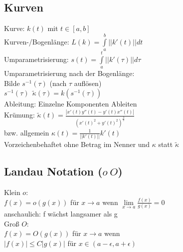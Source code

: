 \documentclass[6pt,a4paper]{scrartcl}
\newcommand{\enbrace}[1]{\ensuremath{\left(#1\right)}}
\begin{document}
\begin{multicols}{4}
\subsection{Kurven}
Kurve: $k(t)$ mit $t \in [a,b]$\\
Kurven-/Bogenlänge: $L(k)=\int\limits_a^b ||k'(t)|| dt$ \\
Umparametrisierung: $s(t)=\int\limits_a^t || k'(\tau) || d\tau$ \\
Umparametrisierung nach der Bogenlänge: \\ 
Bilde $s^{-1}(\tau)$ (nach $\tau$ auflösen) \\
$s^{-1}(\tau) ~~ \tilde\kappa(\tau)=k\enbrace{s^{-1}(\tau)} $ \\
Ableitung: Einzelne Komponenten Ableiten\\
Krümung: $\tilde\kappa(t) = \frac{|x'(t)y''(t)-y'(t)x''(t)|}{(x'(t)^2+y'(t)^2)^\frac{3}{2}}$ \\
bzw. allgemein $\kappa(t)=\frac{1}{||k'(t)||} k'(t)$ \\
Vorzeichenbehaftet ohne Betrag im Nenner und $\kappa$ statt $\tilde\kappa$

\subsection{Landau Notation ($o~O$)}
Klein $o$: \\
$f(x)=o(g(x))$ für $x \rightarrow a$ wenn $\lim\limits_{x\rightarrow a}\frac{f(x)}{g(x)}=0$ \\
anschaulich: f wächst langsamer als g \\
Groß $O$: \\
$f(x)=O(g(x))$ für $x \rightarrow a$ wenn \\
$|f(x)| \leq C|g(x)|$ für $x \in (a-\epsilon, a+\epsilon)$


\end{multicols}
\end{document}
